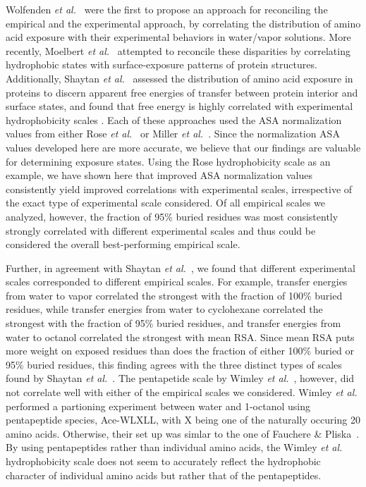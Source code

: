 \documentclass[11pt]{article}
\begin{document}
Wolfenden \emph{et al.}~\cite{Wolfenden1981} were the first to propose an approach for reconciling the empirical and the experimental approach, by correlating the distribution of amino acid exposure with their experimental behaviors in water/vapor solutions. More recently, Moelbert \emph{et al.}~\cite{Moelbert2004} attempted to reconcile these disparities by correlating hydrophobic states with surface-exposure patterns of protein structures. Additionally, Shaytan \emph{et al.}~\cite{Shaytan2009} assessed the distribution of amino acid exposure in proteins to discern apparent free energies of transfer between protein interior and surface states, and found that free energy is highly correlated with experimental hydrophobicity scales \cite{Shaytan2009}. Each of these approaches used the ASA normalization values from either Rose \emph{et al.}~\cite{Rose1985} or Miller \emph{et al.}~\cite{Miller1987}. Since the normalization ASA values developed here are more accurate, we believe that our findings are valuable for determining exposure states. Using the Rose hydrophobicity scale as an example, we have shown here that improved ASA normalization values consistently yield improved correlations with experimental scales, irrespective of the exact type of experimental scale considered.  Of all empirical scales we analyzed, however, the fraction of 95\% buried residues was most consistently strongly correlated with different experimental scales and thus could be considered the overall best-performing empirical scale. 

Further, in agreement with Shaytan \emph{et al.}~\cite{Shaytan2009}, we found that different experimental scales corresponded to different empirical scales. For example, transfer energies from water to vapor correlated the strongest with the fraction of 100\% buried residues, while transfer energies from water to cyclohexane correlated the strongest with the fraction of 95\% buried residues, and transfer energies from water to octanol correlated the strongest with mean RSA. Since mean RSA puts more weight on exposed residues than does the fraction of either 100\% buried or 95\% buried residues, this finding agrees with the three distinct types of scales found by Shaytan \emph{et al.}~\cite{Shaytan2009}. The pentapetide scale by Wimley \emph{et al.}~\cite{Wimley1996}, however, did not correlate well with either of the empirical scales we considered. Wimley \emph{et al.} performed a partioning experiment between water and 1-octanol using pentapeptide species, Ace-WLXLL, with X being one of the naturally occuring 20 amino acids. Otherwise, their set up was simlar to the one of Fauchere \& Pliska~\cite{Fauchere1983}. By using pentapeptides rather than individual amino acids, the Wimley \emph{et al.} hydrophobicity scale does not seem to accurately reflect the hydrophobic character of individual amino acids but rather that of the pentapeptides.
\end{document}
